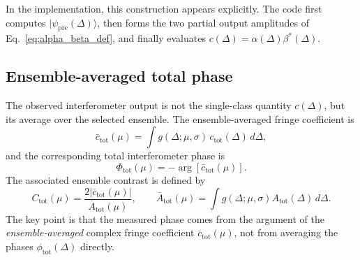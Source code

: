 \documentclass[11pt]{article}
\begin{document}
In the implementation, this construction appears explicitly. The code first computes $|\psi_{\mathrm{pre}}(\Delta)\rangle$, then forms the two partial output amplitudes of Eq.~\eqref{eq:alpha_beta_def}, and finally evaluates $c(\Delta)=\alpha(\Delta)\beta^*(\Delta)$.

\subsection{Ensemble-averaged total phase}
The observed interferometer output is not the single-class quantity $c(\Delta)$, but its average over the selected ensemble. The ensemble-averaged fringe coefficient is
\begin{equation}
\bar{c}_{\mathrm{tot}}(\mu)
=
\int g(\Delta;\mu,\sigma)\,c_{\mathrm{tot}}(\Delta)\,d\Delta,
\label{eq:ensemble_total_c}
\end{equation}
and the corresponding total interferometer phase is
\begin{equation}
\Phi_{\mathrm{tot}}(\mu)
=
-\arg\!\left[\bar{c}_{\mathrm{tot}}(\mu)\right].
\label{eq:ensemble_total_phase}
\end{equation}
The associated ensemble contrast is defined by
\begin{equation}
C_{\mathrm{tot}}(\mu)
=
\frac{2\left|\bar{c}_{\mathrm{tot}}(\mu)\right|}{\bar{A}_{\mathrm{tot}}(\mu)},
\qquad
\bar{A}_{\mathrm{tot}}(\mu)=\int g(\Delta;\mu,\sigma)A_{\mathrm{tot}}(\Delta)\,d\Delta.
\label{eq:total_contrast}
\end{equation}
The key point is that the measured phase comes from the argument of the \emph{ensemble-averaged} complex fringe coefficient $\bar c_{\mathrm{tot}}(\mu)$, not from averaging the phases $\phi_{\mathrm{tot}}(\Delta)$ directly.
\end{document}
